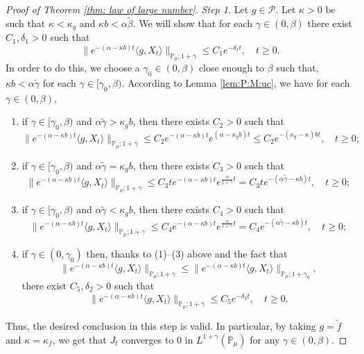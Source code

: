 \documentclass[12pt,a4paper]{amsart}
\theoremstyle{plain}
\theoremstyle{definition}
\numberwithin{equation}{section}
\begin{document}
\begin{proof}[Proof of Theorem \ref{thm: law of large number}]
  \emph{Step 1.} Let $g\in \mathcal P$.
  Let $\kappa > 0$ be such that $\kappa < \kappa_g$ and $\kappa b < \alpha \tilde \beta$.
  We will show that for each $\gamma \in (0,\beta)$ there exist $C_1,\delta_1 > 0$ such that
  \[
    \|e^{-(\alpha - \kappa b)t} \langle g, X_t\rangle\|_{\mathbb P_\mu;1+\gamma}
    \leq C_1 e^{-\delta_1 t},
    \quad t\geq 0.
  \]
  In order to do this, we choose a $\gamma_0 \in (0,\beta)$ close enough to $\beta$ such that, $\kappa b< \alpha \tilde \gamma$ for each $\gamma \in [\gamma_0, \beta)$.
  According to Lemma \ref{lem:P:M:uc}, we have for each $\gamma \in (0,\beta)$,
  \begin{enumerate}
  \item
    if $\gamma \in [\gamma_0, \beta)$ and $\alpha\tilde \gamma> \kappa_g b$, then there exists $C_2>0$ such that
    \[
      \|e^{-(\alpha - \kappa b)t} \langle g, X_t\rangle\|_{\mathbb P_\mu;1+\gamma}
      \leq C_2 e^{-(\alpha-\kappa b)t}e^{(\alpha-\kappa_g b)t}
      \leq C_2  e^{-(\kappa_g - \kappa )bt},
      \quad t\geq 0;
    \]
  \item
    if $\gamma \in [\gamma_0, \beta)$ and $\alpha\tilde \gamma=\kappa_g b$, then there exists $C_3>0$ such that
    \[
      \|e^{-(\alpha - \kappa b)t} \langle g, X_t\rangle\|_{\mathbb P_\mu;1+\gamma}
      \leq C_3 t e^{-(\alpha - \kappa b)t}e^{\frac{\alpha}{1+\gamma}t}
      = C_3 t e^{-(\alpha \tilde \gamma - \kappa b)t},
      \quad t\geq 0;
    \]
  \item
    if $\gamma \in [\gamma_0, \beta)$ and $\alpha\tilde \gamma < \kappa_g b$, then there exists $C_4>0$ such that
    \[
      \|e^{-(\alpha - \kappa b)t} \langle g, X_t\rangle\|_{\mathbb{P}_{\mu};1+\gamma}
      \leq C_4  e^{-(\alpha - \kappa b)t}e^{\frac{\alpha}{1+\gamma}t}
      = C_4  e^{-(\alpha \tilde \gamma - \kappa b)t},
      \quad t\geq 0;
    \]
  \item
    if $\gamma \in (0,\gamma_0)$ then, thanks to (1)--(3) above and the fact that \[\|e^{-(\alpha - \kappa b)t} \langle g, X_t\rangle\|_{\mathbb{P}_{\mu};1+\gamma}
      \leq \|e^{-(\alpha - \kappa b)t} \langle g, X_t\rangle\|_{\mathbb{P}_{\mu};1+\gamma_0},\] there exist $C_5, \delta_2 >0$ such that
    \[
      \|e^{-(\alpha - \kappa b)t} \langle g, X_t\rangle\|_{\mathbb{P}_{\mu};1+\gamma}
      \leq C_5e^{-\delta_2 t},
      \quad t\geq 0.
    \]
  \end{enumerate}
  Thus, the desired conclusion in this step is valid.
  In particular, by taking $g = \widetilde f$ and $\kappa = \kappa_f$, we get that $J_t$ converges to $0$ in $L^{1+\gamma}(\mathbb{P}_{\mu})$ for any $\gamma\in(0,\beta)$.
  

\end{proof}
\end{document}
